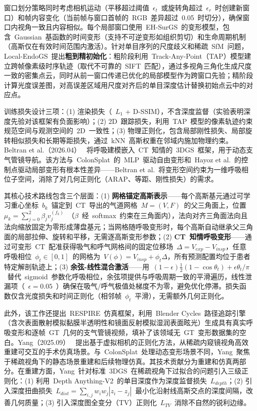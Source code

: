 窗口划分策略同时考虑相机运动（平移超过阈值~$\epsilon_t$~或旋转角超过~$\epsilon_r$~时创建新窗口）和帧内容变化（当前帧与窗口首帧的~RGB~差异超过~0.05~时切分），确保窗口内视角一致且内容相似。每个局部窗口使用~EH-SurGS~的变形模型，包含~Gaussian~基函数的时间变形（支持不可逆变形如组织剪切）和生命周期机制（高斯仅在有效时间范围内激活）。针对单目序列的尺度歧义和稀疏~SfM~问题，Local-EndoGS~提出\textbf{粗到精初始化}：粗阶段利用~Track-Any-Point（TAP）模型建立跨帧像素级时序轨迹（取代不可靠的~SIFT~匹配），通过多视角三角化生成尺度一致的密集点云，同时从前一窗口传递已优化的局部模型作为跨窗口先验；精阶段计算光度误差图，对高误差区域用尺度对齐后的单目深度估计替换初始点云中的对应点。

训练损失设计三项：(1) 渲染损失（~$L_1$ + D-SSIM），不含深度监督（实验表明深度先验对该框架有负面影响）；(2) 2D~跟踪损失，利用~TAP~模型的像素轨迹约束规范空间与观测空间的~2D~一致性；(3) 物理正则化，包含局部刚性损失、局部旋转相似损失和长期等距损失，通过~kNN~高斯权重在邻域内施加物理约束。Beltran et al.（2026.04）~\cite{2604_28179} 将呼吸建模嵌入~CT~知情的~3DGS~框架，用于动态支气管镜导航。该方法与~ColonSplat~的~MLP~驱动自由变形和~Hayoz et al.~的控制点驱动局部变形有根本性差异——Beltran et al.~将变形空间约束为一维呼吸相位子空间，消除了对几何正则化（ARAP、等距、刚性损失）的需求。

其核心技术路线包含三个层面：(1) \textbf{网格锚定高斯表示}——每个高斯基元通过可学习重心坐标~$b_k$~锚定到~CT~导出的气道网格~$M = (V, F)$~的父三角面上，位置~$\mu_k = \sum_{j=0}^{2} \beta_j v_j^{(f_k)}$~（$\beta$~经~softmax~约束在三角面内），法向对齐三角面法向且法向缩放固定为零形成薄盘基元；当网格随呼吸变形时，每个高斯自动继承父三角面的局部拉伸、旋转和平移，无需逐高斯变形参数；(2) \textbf{CT~知情呼吸变形}——通过可变形~CT~配准获得吸气和呼气网格间的固定位移场~$\Delta = V_{exp} - V_{insp}$，任意呼吸相位~$\phi_t \in [0,1]$~的网格为~$V(\phi) = V_{insp} + \phi_t \Delta$，所有预测配置均位于患者特定解剖轨迹上；(3) \textbf{余弦-线性混合激活}——用~$(1-\epsilon)\frac{1}{2}(1-\cos\theta_t) + \epsilon\theta_t/\pi$~替代~sigmoid~参数化呼吸相位，余弦项提供与呼吸周期一致的平滑遍历，线性泄漏项（~$\epsilon=0.05$~）确保在吸气/呼气极值处梯度不为零，避免优化停滞。损失函数仅含光度损失和时间正则化（相邻帧~$\phi_t$~平滑），无需额外几何正则化。

此外，该工作还提出~RESPIRE~仿真框架，利用~Blender Cycles~路径追踪引擎（含次表面散射模拟黏膜半透明性和镜面反射模拟湿润表面眩光）生成具有真实呼吸变形和逐帧~GT~几何的支气管镜视频，填补了该领域无~GT~变形数据集的空白。Yang（2025.09）~\cite{2509_17027} 提出基于虚拟相机的正则化方法，从稀疏内窥镜视角高效重建可交互的手术仿真场景。与~ColonSplat~处理动态变形场景不同，Yang~聚焦于稀疏视角下的静态场景重建和后续物理仿真。其技术贡献分为重建和仿真两部分。在重建方面，Yang~针对标准~3DGS~在稀疏视角下过拟合的问题引入三级正则化：(1) 利用~Depth Anything-V2~的单目深度作为深度监督损失~$L_{depth}$；(2) 引入深度扭曲损失~$L_{dist} = \sum_{i,j} w_i w_j |z_i - z_j|$~最小化沿射线高斯交点的深度间隔，改善几何质量；(3) 引入深度图全变分（TV）正则化~$L_{TV}$~消除不自然的锐利边缘。

